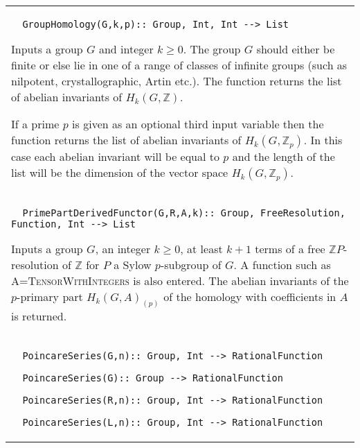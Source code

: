 \documentclass[a4paper,11pt]{report}
\begin{document}
{\begin{center}
\begin{tabular}{|l|}
\begin{verbatim}  GroupHomology(G,k,p):: Group, Int, Int --> List
\end{verbatim}


 

 Inputs a group $G$ and integer $k \ge 0$. The group $G$ should either be finite or else lie in one of a range of classes of infinite
groups (such as nilpotent, crystallographic, Artin etc.). The function returns
the list of abelian invariants of $H_k(G,\mathbb Z)$. 

 If a prime $p$ is given as an optional third input variable then the function returns the
list of abelian invariants of $H_k(G,\mathbb Z_p)$. In this case each abelian invariant will be equal to $p$ and the length of the list will be the dimension of the vector space $H_k(G,\mathbb Z_p)$. \\
 \index{PrimePartDerivedFunctor} 
\begin{verbatim}  PrimePartDerivedFunctor(G,R,A,k):: Group, FreeResolution, Function, Int --> List
\end{verbatim}


 

 Inputs a group $G$, an integer $k \ge 0$, at least $k+1$ terms of a free $\mathbb ZP$-resolution of $\mathbb Z$ for $P$ a Sylow $p$-subgroup of $G$. A function such as \textsc{A=TensorWithIntegers} is also entered. The abelian invariants of the $p$-primary part $H_k(G,A)_{(p)}$ of the homology with coefficients in $A$ is returned. \\
 \index{PoincareSeries} 
\begin{verbatim}  PoincareSeries(G,n):: Group, Int --> RationalFunction
\end{verbatim}
 
\begin{verbatim}  PoincareSeries(G):: Group --> RationalFunction
\end{verbatim}
 
\begin{verbatim}  PoincareSeries(R,n):: Group, Int --> RationalFunction
\end{verbatim}
 
\begin{verbatim}  PoincareSeries(L,n):: Group, Int --> RationalFunction
\end{verbatim}


 


\end{tabular}
\end{center}}
\end{document}
